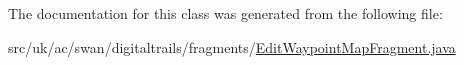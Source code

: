 The documentation for this class was generated from the following file\+:\begin{DoxyCompactItemize}
\item 
src/uk/ac/swan/digitaltrails/fragments/\hyperlink{_edit_waypoint_map_fragment_8java}{Edit\+Waypoint\+Map\+Fragment.\+java}\end{DoxyCompactItemize}
